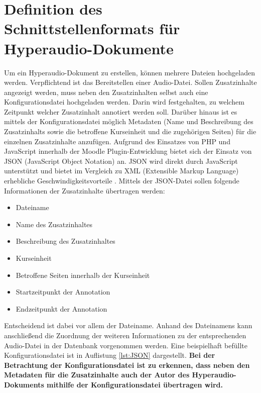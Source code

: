 \section{Definition des Schnittstellenformats für Hyperaudio-Dokumente}
\label{sec:konfigurationsdatei}
Um ein Hyperaudio-Dokument zu erstellen, können mehrere Dateien hochgeladen werden. Verpflichtend ist das Bereitstellen einer Audio-Datei. Sollen Zusatzinhalte angezeigt werden, muss neben den Zusatzinhalten selbst auch eine Konfigurationsdatei hochgeladen werden. Darin wird festgehalten, zu welchem Zeitpunkt welcher Zusatzinhalt annotiert werden soll. Darüber hinaus ist es mittels der Konfigurationsdatei möglich Metadaten (Name und Beschreibung des Zusatzinhalts sowie die betroffene Kurseinheit und die zugehörigen Seiten) für die einzelnen Zusatzinhalte anzufügen.
Aufgrund des Einsatzes von PHP und JavaScript innerhalb der Moodle Plugin-Entwicklung bietet sich der Einsatz von JSON (JavaScript Object Notation) an. JSON wird direkt durch JavaScript unterstützt und bietet im Vergleich zu XML (Extensible Markup Language) erhebliche Geschwindigkeitsvorteile \citep{nurseitov2009comparison}.
Mittels der JSON-Datei sollen folgende Informationen der Zusatzinhalte übertragen werden:

\begin{itemize}
\item Dateiname
\item Name des Zusatzinhaltes
\item Beschreibung des Zusatzinhaltes
\item Kurseinheit
\item Betroffene Seiten innerhalb der Kurseinheit
\item Startzeitpunkt der Annotation
\item Endzeitpunkt der Annotation
\end{itemize}


Entscheidend ist dabei vor allem der Dateiname. Anhand des Dateinamens kann anschließend die Zuordnung der weiteren Informationen zu der entsprechenden Audio-Datei in der Datenbank vorgenommen werden. Eine beispielhaft befüllte Konfigurationsdatei ist in Auflistung \ref{lst:JSON} dargestellt. \textbf{Bei der Betrachtung der Konfigurationsdatei ist zu erkennen, dass neben den Metadaten für die Zusatzinhalte auch der Autor des Hyperaudio-Dokuments mithilfe der Konfigurationsdatei übertragen wird.}

